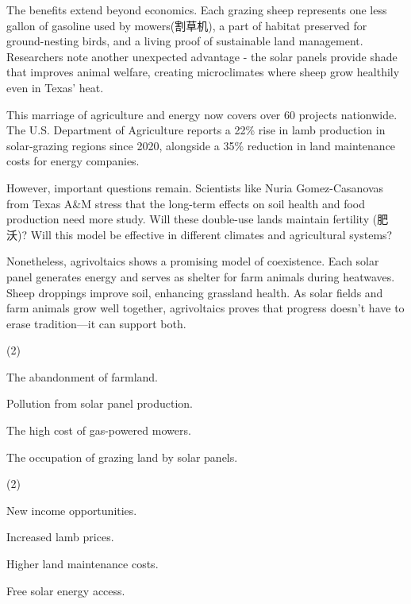 \documentclass{英语试卷}
\begin{document}
\par The benefits extend beyond economics. Each grazing sheep represents one less gallon of gasoline used by mowers(割草机), a part of habitat preserved for ground-nesting birds, and a living proof of sustainable land management. Researchers note another unexpected advantage - the solar panels provide shade that improves animal welfare, creating microclimates where sheep grow healthily even in Texas' heat.\par
\par This marriage of agriculture and energy now covers over 60 projects nationwide. The U.S. Department of Agriculture reports a 22\% rise in lamb production in solar-grazing regions since 2020, alongside a 35\% reduction in land maintenance costs for energy companies.\par
\par However, important questions remain. Scientists like Nuria Gomez-Casanovas from Texas A\&M stress that the long-term effects on soil health and food production need more study. Will these double-use lands maintain fertility (肥沃)? Will this model be effective in different climates and agricultural systems?\par
\par Nonetheless, agrivoltaics shows a promising model of coexistence. Each solar panel generates energy and serves as shelter for farm animals during heatwaves. Sheep droppings improve soil, enhancing grassland health. As solar fields and farm animals grow well together, agrivoltaics proves that progress doesn't have to erase tradition—it can support both.\par
{}
\begin{choices}(2)
  \item The abandonment of farmland.
  \item Pollution from solar panel production.
  \item The high cost of gas-powered mowers.
  \item The occupation of grazing land by solar panels.
\end{choices}
\begin{choices}(2)
  \item New income opportunities.
  \item Increased lamb prices.
  \item Higher land maintenance costs.
  \item Free solar energy access.
\end{choices}
\end{document}
